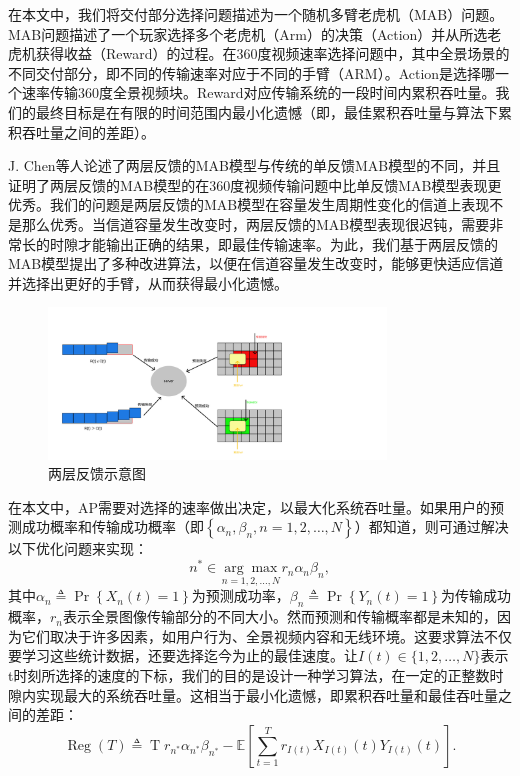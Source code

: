 在本文中，我们将交付部分选择问题描述为一个随机多臂老虎机（MAB）问题。MAB问题描述了一个玩家选择多个老虎机（Arm）的决策（Action）并从所选老虎机获得收益（Reward）的过程。在360度视频速率选择问题中，其中全景场景的不同交付部分，即不同的传输速率对应于不同的手臂（ARM）。Action是选择哪一个速率传输360度全景视频块。Reward对应传输系统的一段时间内累积吞吐量。我们的最终目标是在有限的时间范围内最小化遗憾（即，最佳累积吞吐量与算法下累积吞吐量之间的差距）。


J. Chen等人\cite{ref8}论述了两层反馈的MAB模型与传统的单反馈MAB模型的不同，并且证明了两层反馈的MAB模型的在360度视频传输问题中比单反馈MAB模型表现更优秀。我们的问题是两层反馈的MAB模型在容量发生周期性变化的信道上表现不是那么优秀。当信道容量发生改变时，两层反馈的MAB模型表现很迟钝，需要非常长的时隙才能输出正确的结果，即最佳传输速率。为此，我们基于两层反馈的MAB模型提出了多种改进算法，以便在信道容量发生改变时，能够更快适应信道并选择出更好的手臂，从而获得最小化遗憾。
\begin{figure}[h]
	\centering
	\includegraphics[width=0.8\textwidth]{figure/两层反馈.pdf}
	\caption{两层反馈示意图}
	\label{fig失败}
\end{figure}
在本文中，AP需要对选择的速率做出决定，以最大化系统吞吐量。如果用户的预测成功概率和传输成功概率（即$\left\{\alpha_{n}, \beta_{n}, n=1,2, \ldots, N\right\}$）都知道，则可通过解决以下优化问题来实现：
\begin{equation*}
n^{*} \in \underset{n=1,2, \ldots, N}{\arg \max } r_{n} \alpha_{n} \beta_{n},
\end{equation*}
其中$\alpha_{n} \triangleq \operatorname{Pr}\left\{X_{n}(t)=1\right\}$为预测成功率，$\beta_{n} \triangleq \operatorname{Pr}\left\{Y_{n}(t)=1\right\}$为传输成功概率，$r_{n}$表示全景图像传输部分的不同大小。然而预测和传输概率都是未知的，因为它们取决于许多因素，如用户行为、全景视频内容和无线环境。这要求算法不仅要学习这些统计数据，还要选择迄今为止的最佳速度。让$I(t) \in\{1,2, \ldots, N\}$表示t时刻所选择的速度的下标，我们的目的是设计一种学习算法，在一定的正整数时隙内实现最大的系统吞吐量。这相当于最小化遗憾，即累积吞吐量和最佳吞吐量之间的差距：
\begin{equation*}
\operatorname{Reg}(T) \triangleq \operatorname T{r}_{n^{*}} \alpha_{n^{*}} \beta_{n^{*}}-\mathbb{E}\left[\sum_{t=1}^{T} r_{I(t)} X_{I(t)}(t) Y_{I(t)}(t)\right].
\end{equation*}


